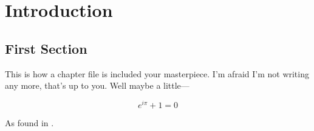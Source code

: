 
\chapter{Introduction}
\label{cha:introduction}

	\section{First Section}
	\label{sec:first_section}

		This is how a chapter file is included your masterpiece. I'm afraid I'm not writing any more, that's up to you. Well maybe a little---

		\[
			e^{i\pi} + 1 = 0
		\]

		\noindent %
		As found in \cite{ashsco}.


